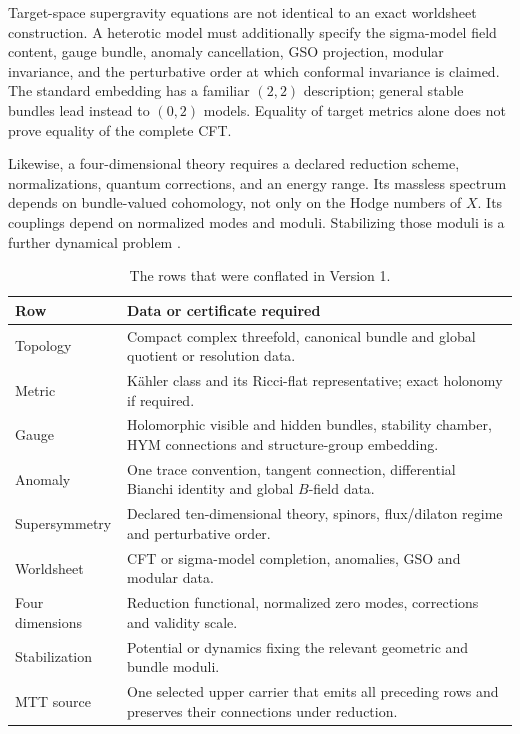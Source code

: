 \documentclass[11pt]{article}
\theoremstyle{definition}
\theoremstyle{remark}
\begin{document}
Target-space supergravity equations are not identical to an exact worldsheet
construction.  A heterotic model must additionally specify the sigma-model
field content, gauge bundle, anomaly cancellation, GSO projection, modular
invariance, and the perturbative order at which conformal invariance is
claimed.  The standard embedding has a familiar \((2,2)\) description;
general stable bundles lead instead to \((0,2)\) models.  Equality of target
metrics alone does not prove equality of the complete CFT.

Likewise, a four-dimensional theory requires a declared reduction scheme,
normalizations, quantum corrections, and an energy range.  Its massless
spectrum depends on bundle-valued cohomology, not only on the Hodge numbers
of \(X\).  Its couplings depend on normalized modes and moduli.  Stabilizing
those moduli is a further dynamical problem
\cite{AndersonEtAl2011}.

\begin{table}[t]
\centering
\small
\begin{tabularx}{\textwidth}{@{}p{}X@{}}
\toprule
Row & Data or certificate required \\
\midrule
Topology & Compact complex threefold, canonical bundle and global quotient
or resolution data. \\
Metric & K\"ahler class and its Ricci-flat representative; exact holonomy if
required. \\
Gauge & Holomorphic visible and hidden bundles, stability chamber, HYM
connections and structure-group embedding. \\
Anomaly & One trace convention, tangent connection, differential Bianchi
identity and global \(B\)-field data. \\
Supersymmetry & Declared ten-dimensional theory, spinors, flux/dilaton
regime and perturbative order. \\
Worldsheet & CFT or sigma-model completion, anomalies, GSO and modular data. \\
Four dimensions & Reduction functional, normalized zero modes, corrections
and validity scale. \\
Stabilization & Potential or dynamics fixing the relevant geometric and
bundle moduli. \\
MTT source & One selected upper carrier that emits all preceding rows and
preserves their connections under reduction. \\
\bottomrule
\end{tabularx}
\caption{The rows that were conflated in Version 1.}
\label{tab:rows}
\end{table}
\end{document}
